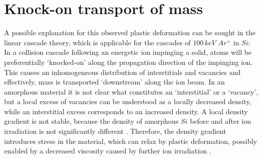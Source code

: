 \section{Knock-on transport of mass}

A possible explanation for this observed plastic deformation can be sought in the linear cascade theory, which is applicable for the cascades of $100\,keV\,\,Ar^+$ in $Si$: In a collision cascade following an energetic ion impinging a solid, atoms will be preferentially `knocked-on' along the propagation direction of the impinging ion. This causes an inhomogeneous distribution of interstitials and vacancies and effectively, mass is transported `downstream' along the ion beam. In an amorphous material it is not clear what constitutes an `interstitial' or a `vacancy', but a local excess of vacancies can be understood as a locally decreased density, while an interstitial excess corresponds to an increased density. A local density gradient is not stable, because the density of amorphous $Si$ before and after ion irradiation is not significantly different \cite{pelaz_ion-beam-induced_2004}. Therefore, the density gradient introduces stress in the material, which can relax by plastic deformation, possibly enabled by a decreased viscosity caused by further ion irradiation \cite{snoeks_stress_1997,hu_burrowing_2002,mayr_mechanisms_2003,mayr_effect_2003}. 

